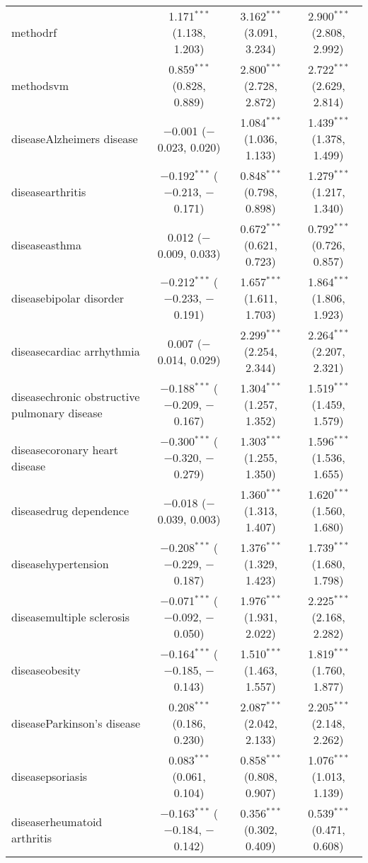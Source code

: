 \begin{table}[!htbp]
\begin{tabular}{@{\extracolsep{5pt}}lccc}
  methodrf & 1.171$^{***}$ (1.138, 1.203) & 3.162$^{***}$ (3.091, 3.234) & 2.900$^{***}$ (2.808, 2.992) \\ 
  methodsvm & 0.859$^{***}$ (0.828, 0.889) & 2.800$^{***}$ (2.728, 2.872) & 2.722$^{***}$ (2.629, 2.814) \\ 
  diseaseAlzheimers disease & $-$0.001 ($-$0.023, 0.020) & 1.084$^{***}$ (1.036, 1.133) & 1.439$^{***}$ (1.378, 1.499) \\ 
  diseasearthritis & $-$0.192$^{***}$ ($-$0.213, $-$0.171) & 0.848$^{***}$ (0.798, 0.898) & 1.279$^{***}$ (1.217, 1.340) \\ 
  diseaseasthma & 0.012 ($-$0.009, 0.033) & 0.672$^{***}$ (0.621, 0.723) & 0.792$^{***}$ (0.726, 0.857) \\ 
  diseasebipolar disorder & $-$0.212$^{***}$ ($-$0.233, $-$0.191) & 1.657$^{***}$ (1.611, 1.703) & 1.864$^{***}$ (1.806, 1.923) \\ 
  diseasecardiac arrhythmia & 0.007 ($-$0.014, 0.029) & 2.299$^{***}$ (2.254, 2.344) & 2.264$^{***}$ (2.207, 2.321) \\ 
  diseasechronic obstructive pulmonary disease & $-$0.188$^{***}$ ($-$0.209, $-$0.167) & 1.304$^{***}$ (1.257, 1.352) & 1.519$^{***}$ (1.459, 1.579) \\ 
  diseasecoronary heart disease & $-$0.300$^{***}$ ($-$0.320, $-$0.279) & 1.303$^{***}$ (1.255, 1.350) & 1.596$^{***}$ (1.536, 1.655) \\ 
  diseasedrug dependence & $-$0.018 ($-$0.039, 0.003) & 1.360$^{***}$ (1.313, 1.407) & 1.620$^{***}$ (1.560, 1.680) \\ 
  diseasehypertension & $-$0.208$^{***}$ ($-$0.229, $-$0.187) & 1.376$^{***}$ (1.329, 1.423) & 1.739$^{***}$ (1.680, 1.798) \\ 
  diseasemultiple sclerosis & $-$0.071$^{***}$ ($-$0.092, $-$0.050) & 1.976$^{***}$ (1.931, 2.022) & 2.225$^{***}$ (2.168, 2.282) \\ 
  diseaseobesity & $-$0.164$^{***}$ ($-$0.185, $-$0.143) & 1.510$^{***}$ (1.463, 1.557) & 1.819$^{***}$ (1.760, 1.877) \\ 
  diseaseParkinson's disease & 0.208$^{***}$ (0.186, 0.230) & 2.087$^{***}$ (2.042, 2.133) & 2.205$^{***}$ (2.148, 2.262) \\ 
  diseasepsoriasis & 0.083$^{***}$ (0.061, 0.104) & 0.858$^{***}$ (0.808, 0.907) & 1.076$^{***}$ (1.013, 1.139) \\ 
  diseaserheumatoid arthritis & $-$0.163$^{***}$ ($-$0.184, $-$0.142) & 0.356$^{***}$ (0.302, 0.409) & 0.539$^{***}$ (0.471, 0.608) \\ 

\end{tabular}
\end{table}
